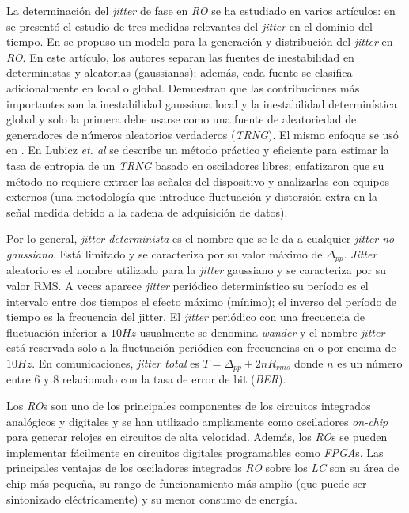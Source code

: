 La determinación del \textit{jitter} de fase en \emph{RO} se ha estudiado en varios artículos: en \cite{McNeill1997} se presentó el estudio de tres medidas relevantes del \textit{jitter} en el dominio del tiempo.
En \cite{Valtchanov2008} se propuso un modelo para la generación y distribución del \textit{jitter} en \emph{RO}.
En este artículo, los autores separan las fuentes de inestabilidad en deterministas y aleatorias (gaussianas); además, cada fuente se clasifica adicionalmente en local o global.
Demuestran que las contribuciones más importantes son la inestabilidad gaussiana local y la inestabilidad determinística global y solo la primera debe usarse como una fuente de aleatoriedad de generadores de números aleatorios verdaderos (\emph{TRNG}).
El mismo enfoque se usó en \cite{Fischer2008, Valtchanov2010, Baudet2011, Jessa2011}.
En Lubicz \textit{et. al} se describe un método práctico y eficiente para estimar la tasa de entropía de un \emph{TRNG} basado en osciladores libres; enfatizaron que su método no requiere extraer las señales del dispositivo y analizarlas con equipos externos \cite{Lubicz2014} (una metodología que introduce fluctuación y distorsión extra en la señal medida debido a la cadena de adquisición de datos).

Por lo general, \emph{jitter determinista} es el nombre que se le da a cualquier \emph{jitter no gaussiano}.
Está limitado y se caracteriza por su valor máximo de $\Delta_{pp}$.
\textit{Jitter} aleatorio es el nombre utilizado para la \textit{jitter} gaussiano y se caracteriza por su valor RMS.
A veces aparece \textit{jitter} periódico determinístico su período es el intervalo entre dos tiempos el efecto máximo (mínimo); el inverso del período de tiempo es la frecuencia del jitter.
El \textit{jitter} periódico con una frecuencia de fluctuación inferior a $10 Hz$ usualmente se denomina \emph{wander} y el nombre \emph{jitter} está reservada solo a la fluctuación periódica con frecuencias en o por encima de $10 Hz$.
En comunicaciones, \emph{jitter total} es $T = \Delta_{pp} + 2nR_{rms}$ donde $n$ es un número entre $6$ y $8$ relacionado con la tasa de error de bit (\emph{BER}).

Los \emph{RO}s son uno de los principales componentes de los circuitos integrados analógicos y digitales y se han utilizado ampliamente como osciladores \emph{on-chip} para generar relojes en circuitos de alta velocidad.
Además, los \emph{RO}s se pueden implementar fácilmente en circuitos digitales programables como \emph{FPGA}s.
Las principales ventajas de los osciladores integrados \emph{RO} sobre los \emph{LC} son su área de chip más pequeña, su rango de funcionamiento más amplio (que puede ser sintonizado eléctricamente) y su menor consumo de energía.

